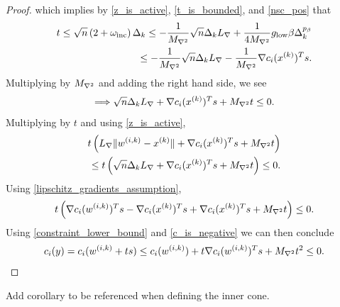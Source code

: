 \begin{proof}
which implies by \cref{z_is_active}, \cref{t_is_bounded}, and \cref{nsc_pos} that
\begin{align*}
t 
\le \sqrt{n} \left(2 + \omega_{\text{inc}} \right) \Delta_k 
\le -\frac 1 {{M_{\nabla^2}}} \sqrt{n}\Delta_k {L_{\nabla}} + \frac 1 {4{M_{\nabla^2}}} { g_{\textrm{low}} } \beta \Delta_k^{p_{\beta}} \\
\le -\frac 1 {{M_{\nabla^2}}} \sqrt{n}\Delta_k {L_{\nabla}} -\frac 1 {{M_{\nabla^2}}} \nabla c_i(x^{(k)})^Ts.
\end{align*}
Multiplying by ${M_{\nabla^2}}$ and adding the right hand side, we see
\begin{align*}
\Longrightarrow \sqrt{n}\Delta_k {L_{\nabla}} + \nabla c_i(x^{(k)})^Ts + {M_{\nabla^2}} t \le 0.
\end{align*}
Multiplying by $t$ and using \cref{z_is_active},
\begin{align*}
 t \left({L_{\nabla}}\|{w^{(i, k)}} - x^{(k)}\| + \nabla c_i(x^{(k)})^Ts + {M_{\nabla^2}} t\right) \\
 \le t \left(\sqrt{n}\Delta_k {L_{\nabla}} + \nabla c_i(x^{(k)})^Ts + {M_{\nabla^2}} t\right) \le 0.
\end{align*}
Using \cref{lipschitz_gradients_assumption},
\begin{align*}
t \left(\nabla c_i({w^{(i, k)}})^Ts - \nabla c_i(x^{(k)})^Ts + \nabla c_i(x^{(k)})^Ts + {M_{\nabla^2}} t\right) \le 0.
\end{align*}
Using \cref{constraint_lower_bound} and \cref{c_is_negative} we can then conclude
\begin{align*}
c_i(y) = c_i({w^{(i, k)}} + ts) \le c_i({w^{(i, k)}}) + t\nabla c_i({w^{(i, k)}})^Ts + {M_{\nabla^2}} t^2 \le 0.
\end{align*}

\end{proof}






\begin{boxedcomment}
Add corollary to be referenced when defining the inner cone.
\end{boxedcomment}

